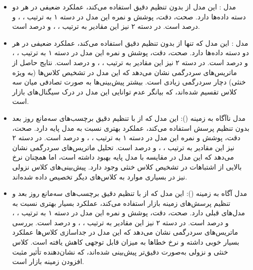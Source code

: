 \begin{itemize}
    \item مدل : این مدل از  بدون تنظیم دقیق استفاده می‌کند، عملکرد ضعیفی در هر دو دسته داده‌ها دارد. صحت، دقت، پوشش و نمره  این مدل در دسته ۱ به ترتیب ، ،  و  درصد است. در دسته ۲ نیز این مقادیر به ترتیب ، ،  و  درصد است.
    
    \item مدل :
    این مدل که تنها از  بدون تنظیم دقیق استفاده می‌کند، عملکرد ضعیفی در هر دو دسته داده‌ها دارد. صحت، دقت، پوشش و نمره  این مدل در دسته ۱ به ترتیب ، ،  و  درصد است. در دسته ۲ نیز این مقادیر به ترتیب ، ،  و  درصد است. نتایج حاصل از ماتریس‌های سردرگمی نشان می‌دهد که این مدل در تشخیص کلاس‌ها (به ویژه خنثی) دچار سردرگمی زیادی است. بیشتر پیش‌بینی‌ها به صورت تصادفی میان سه کلاس تقسیم شده‌اند، که بیانگر عدم توانایی این مدل در درک سیگنال‌های بازار است.
    
    \item مدل نا‌آگاه به زمینه ():  
    این مدل که از  با تنظیم دقیق برچسب‌های سه‌مانع روز بعد بدون تنظیم پرسش استفاده می‌کند، عملکرد بهتری نسبت به مدل پایه دارد. صحت، دقت، پوشش و نمره  این مدل در دسته ۱ به ترتیب ، ،  و  درصد است. در دسته ۲ نیز این مقادیر به ترتیب ، ،  و  درصد است. تحلیل ماتریس‌های سردرگمی نشان می‌دهد که این مدل در مقایسه با مدل پایه بهبود داشته است، اما همچنان نرخ بالایی از اشتباهات در تشخیص کلاس خنثی وجود دارد. پیش‌بینی‌های کلاس نزولی نیز در بسیاری موارد به کلاس‌های دیگر تخصیص داده شده‌اند.  
    
    \item مدل آگاه به زمینه ():  
    این مدل که از  با تنظیم دقیق برچسب‌های سه‌مانع روز بعد و تنظیم پرسش‌های زمینه بازار استفاده می‌کند، عملکرد بسیار بهتری نسبت به مدل‌های قبلی دارد. صحت، دقت، پوشش و نمره  این مدل در دسته ۱ به ترتیب ، ،  و  درصد است. در دسته ۲ نیز این مقادیر به ترتیب ، ،  و  درصد است. بررسی ماتریس‌های سردرگمی نشان می‌دهد که این مدل در جداسازی کلاس‌ها عملکرد بسیار خوبی داشته و نرخ خطاها به میزان قابل توجهی کاهش یافته است. کلاس خنثی و نزولی به‌صورت دقیق‌تر پیش‌بینی شده‌اند، که نشان‌دهنده تأثیر مثبت افزودن زمینه بازار است.  
    

\end{itemize}
